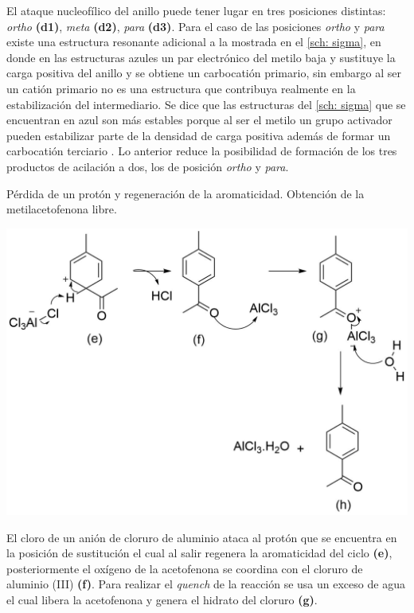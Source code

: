 \documentclass[fleqn,11pt]{SelfArx}
\begin{document}
El ataque nucleofílico del anillo puede tener lugar en tres posiciones distintas: \textit{ortho} \textbf{(d1)}, \textit{meta} \textbf{(d2)}, \textit{para} \textbf{(d3)}. Para el caso de las posiciones \textit{ortho} y \textit{para} existe una estructura resonante adicional a la mostrada en el \autoref{sch: sigma}, en donde en las estructuras azules un par electrónico del metilo baja y sustituye la carga positiva del anillo y se obtiene un carbocatión primario, sin embargo al ser un catión primario no es una estructura que contribuya realmente en la estabilización del intermediario. Se dice que las estructuras del \autoref{sch: sigma} que se encuentran en azul son más estables porque al ser el metilo un grupo activador pueden estabilizar parte de la densidad de carga positiva además de formar un carbocatión terciario \cite{Wade2013}. Lo anterior reduce la posibilidad de formación de los tres productos de acilación a dos, los de posición \textit{ortho} y \textit{para}.
\begin{scheme}[h]
	\centering
	\caption{Pérdida de un protón y regeneración de la aromaticidad. Obtención de la metilacetofenona libre.}
	\includegraphics[width=\linewidth]{structures/mechanism2.png}
\end{scheme}

El cloro de un anión de cloruro de aluminio ataca al protón que se encuentra en la posición de sustitución el cual al salir regenera la aromaticidad del ciclo \textbf{(e)}, posteriormente el oxígeno de la acetofenona se coordina con el cloruro de aluminio (III) \textbf{(f)}. Para realizar el \textit{quench} de la reacción se usa un exceso de agua el cual libera la acetofenona y genera el hidrato del cloruro \textbf{(g)}.
\end{document}
